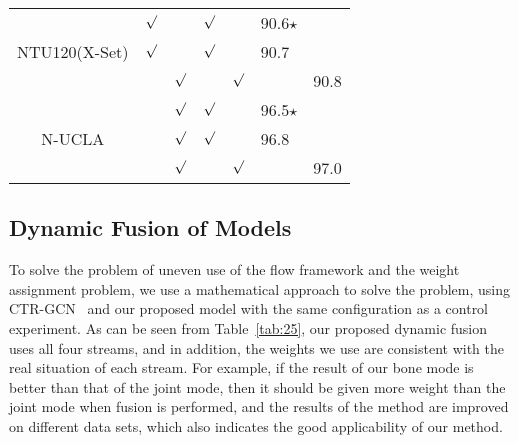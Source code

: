 \documentclass[letterpaper]{article} \usepackage[submission]{aaai23}  \usepackage{times}  \usepackage{helvet}  \usepackage{courier}  \usepackage[hyphens]{url}  \usepackage{graphicx} \urlstyle{rm} \def\UrlFont{\rm}  \usepackage{natbib}  \usepackage{caption} \frenchspacing  \setlength{\pdfpagewidth}{8.5in} \setlength{\pdfpageheight}{11in} \usepackage{algorithm}
\begin{document}
\begin{table*}[ht]
\begin{tabular}{cccclll}
\multicolumn{1}{c}{} & \multicolumn{1}{c}{$\surd$} & \multicolumn{1}{c}{}  & \multicolumn{1}{c}{$\surd$} & \multicolumn{1}{l}{}   & \multicolumn{1}{l}{90.6$\star 
$} & \multicolumn{1}{l}{}       \\ 
\multicolumn{1}{c}{{NTU120(X-Set)}}                              & \multicolumn{1}{c}{$\surd$} & \multicolumn{1}{c}{}  & \multicolumn{1}{c}{$\surd$} & \multicolumn{1}{l}{}   & \multicolumn{1}{l}{90.7} & \multicolumn{1}{l}{}       \\ 
\multicolumn{1}{c}{}                              & \multicolumn{1}{l}{}  & \multicolumn{1}{c}{$\surd$} & \multicolumn{1}{c}{}  & \multicolumn{1}{c}{$\surd$}  & \multicolumn{1}{l}{}     & \multicolumn{1}{c}{90.8}   \\ \hline

\multicolumn{1}{c}{} & \multicolumn{1}{c}{} & \multicolumn{1}{c}{$\surd$}  & \multicolumn{1}{c}{$\surd$} & \multicolumn{1}{l}{}   & \multicolumn{1}{l}{96.5$\star 
$} & \multicolumn{1}{l}{}       \\ 
\multicolumn{1}{c}{{N-UCLA}}                              & \multicolumn{1}{c}{} & \multicolumn{1}{c}{$\surd$}  & \multicolumn{1}{c}{$\surd$} & \multicolumn{1}{l}{}   & \multicolumn{1}{l}{96.8} & \multicolumn{1}{l}{}       \\ 
\multicolumn{1}{c}{}                              & \multicolumn{1}{l}{}  & \multicolumn{1}{c}{$\surd$} & \multicolumn{1}{c}{}  & \multicolumn{1}{c}{$\surd$}  & \multicolumn{1}{l}{}     & \multicolumn{1}{c}{97.0}   \\ \hline

\end{tabular}
\caption{Comparison of dynamic nonlinear fusion settings. Where $\star$ denotes the SOTA model selected to be compared, Number of Streams indicates the number of stream used, Same data set configuration indicates whether to use the previous model fusion weights, Using Dynamic Fusion indicates whether weights are dynamically assigned for different streams.}
\label{tab:25}
\end{table*}
\subsection{Dynamic Fusion of Models}
To solve the problem of uneven use of the flow framework and the weight assignment problem, we use a mathematical approach to solve the problem, using CTR-GCN~\cite{2021Channel} and our proposed model with the same configuration as a control experiment. As can be seen from Table~\ref{tab:25}, our proposed dynamic fusion uses all four streams, and in addition, the weights we use are consistent with the real situation of each stream. For example, if the result of our bone mode is better than that of the joint mode, then it should be given more weight than the joint mode when fusion is performed, and the results of the method are improved on different data sets, which also indicates the good applicability of our method.
\end{document}
